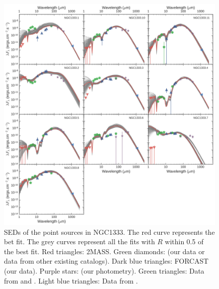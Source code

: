 \begin{figure}
\begin{center}
\includegraphics[width=\textwidth]{Figures/NGC1333_SEDs.jpg}
\caption[NGC1333 SEDs]{SEDs of the point sources in NGC1333. The red curve represents the bet fit. The grey curves represent all the fits with $R$ within 0.5 of the best fit. Red triangles: 2MASS. Green diamonds: \Spitzer (our data or data from other existing catalogs). Dark blue triangles: FORCAST (our data). Purple stars: \Herschel (our photometry). Green triangles: Data from \citep{vanKempen:2009ku} and \citep{vanKempen:2012fb}. Light blue triangles: Data from \citet{Enoch:2009ch}.}
\label{fig:NGC1333_SEDs}
\end{center}
\end{figure}

